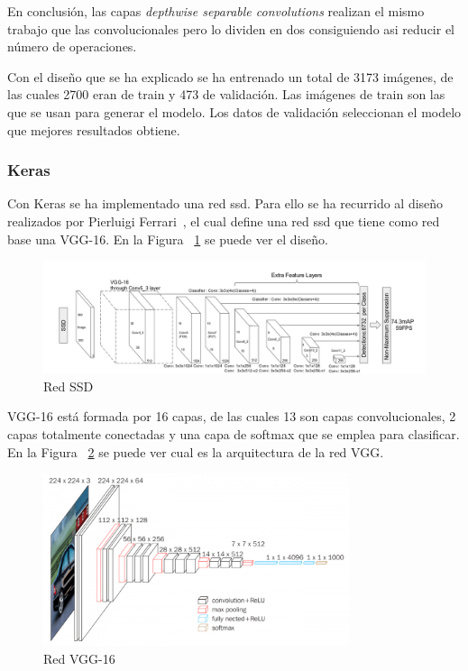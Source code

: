 En conclusión, las capas \textit{depthwise separable convolutions} realizan el mismo trabajo que las convolucionales pero lo dividen en dos consiguiendo asi reducir el número de operaciones.

Con el diseño que se ha explicado se ha entrenado un total de 3173 imágenes, de las cuales 2700 eran de train y 473 de validación. Las imágenes de train son las que se usan para generar el modelo. Los datos de validación seleccionan el modelo que mejores resultados obtiene.

 \subsubsection{Keras}
 
 Con Keras se ha implementado una red \acrshort{ssd}. Para ello se ha recurrido al diseño realizados por Pierluigi Ferrari~\cite{ssd_ferrari}, el cual define una red \acrshort{ssd} que tiene como red base una VGG-16. En la Figura ~\ref{fig.ssd_300} se puede ver el diseño.
 
 \begin{figure}
\begin{center}
	\includegraphics[width=1.1\textwidth]{figures/Diseno_global/ssd300.png}
   \caption{Red SSD}
	\label{fig.ssd_300}
\end{center}
\end{figure}

VGG-16  está formada por 16 capas, de las cuales 13 son capas convolucionales, 2 capas totalmente conectadas y una capa de softmax que se emplea para clasificar. En la Figura ~\ref{fig.vgg16} se puede ver cual es la arquitectura de la red VGG.

 \begin{figure}
\begin{center}
	\includegraphics[width=0.8\textwidth]{figures/Diseno_global/vgg16.png}
   \caption{Red VGG-16}
	\label{fig.vgg16}
\end{center}
\end{figure}

